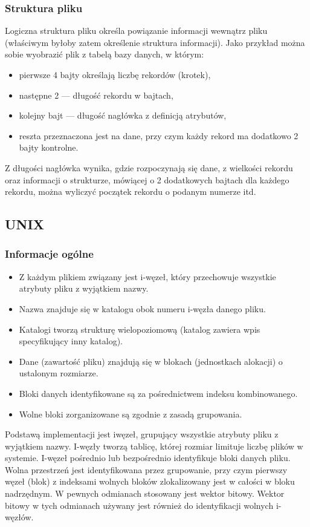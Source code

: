 \documentclass[main.tex]{subfiles}
\begin{document}
    \subsubsection{Struktura pliku}
    Logiczna struktura pliku określa powiązanie informacji wewnątrz pliku (właściwym byłoby zatem określenie struktura informacji).
    Jako przykład można sobie wyobrazić plik z tabelą bazy danych, w którym:
    \begin{itemize}
        \item pierwsze 4 bajty określają liczbę rekordów (krotek),
        \item następne 2 — długość rekordu w bajtach,
        \item kolejny bajt — długość nagłówka z definicją atrybutów,
        \item reszta przeznaczona jest na dane, przy czym każdy rekord ma dodatkowo 2 bajty kontrolne.
    \end{itemize}
    Z długości nagłówka wynika, gdzie rozpoczynają się dane, z wielkości rekordu oraz informacji o strukturze, mówiącej o 2
    dodatkowych bajtach dla każdego rekordu, można wyliczyć początek rekordu o podanym numerze itd.

    \subsection{UNIX}
    \subsubsection{Informacje ogólne}
    \begin{itemize}
        \item Z każdym plikiem związany jest i-węzeł, który przechowuje wszystkie atrybuty pliku z wyjątkiem nazwy.
        \item Nazwa znajduje się w katalogu obok numeru i-węzła danego pliku.
        \item Katalogi tworzą strukturę wielopoziomową (katalog zawiera wpis specyfikujący inny katalog).
        \item Dane (zawartość pliku) znajdują się w blokach (jednostkach alokacji) o ustalonym rozmiarze.
        \item Bloki danych identyfikowane są za pośrednictwem indeksu kombinowanego.
        \item Wolne bloki zorganizowane są zgodnie z zasadą grupowania.
    \end{itemize}

    Podstawą implementacji jest iwęzeł, grupujący wszystkie
    atrybuty pliku z wyjątkiem nazwy. I-węzły tworzą tablicę, której rozmiar limituje liczbę plików w systemie. I-węzeł pośrednio lub
    bezpośrednio identyfikuje bloki danych pliku. Wolna przestrzeń jest identyfikowana przez grupowanie, przy czym pierwszy węzeł
    (blok) z indeksami wolnych bloków zlokalizowany jest w całości w bloku nadrzędnym. W pewnych odmianach stosowany jest
    wektor bitowy. Wektor bitowy w tych odmianach używany jest również do identyfikacji wolnych i-węzłów.
\end{document}
